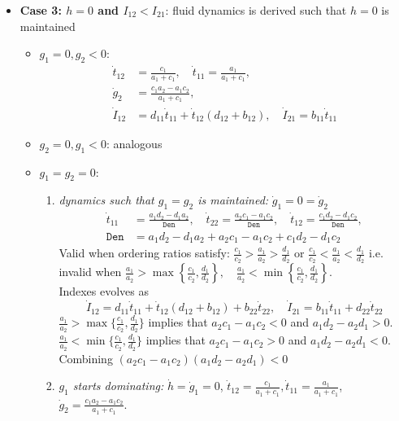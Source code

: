 \documentclass{article}
\begin{document}
\begin{itemize}[leftmargin=*, nosep]
  \item \textbf{Case 3: $h = 0$ and  $I_{12} < I_{21}$}: fluid dynamics is derived such that $h=0$ is maintained
  \begin{itemize}[leftmargin=*]
    \item $g_1 = 0, g_2 < 0$:
      \[
        \begin{aligned}
        \dot{t}_{12} &= \frac{c_1}{a_1 + c_1}, \quad \dot{t}_{11} = \frac{a_1}{a_1 + c_1}, \\
        \dot{g}_2 &= \frac{c_1 a_2 - a_1 c_2}{a_1 + c_1}, \\
        \dot{I}_{12} &= d_{11} \dot{t}_{11} + \dot{t}_{12}(d_{12} + b_{12}), \quad \dot{I}_{21} = b_{11} \dot{t}_{11}
        \end{aligned}
      \]
    \item $g_2 = 0, g_1 < 0$: analogous
    \item $g_1 = g_2 = 0$:
      \begin{enumerate}[label=(\roman*),leftmargin=*]
        \item \textit{dynamics such that $g_1=g_2$ is maintained:}  $\dot{g}_1=0=\dot{g}_2$
          \[
            \begin{aligned}
            \dot{t}_{11} &= \frac{a_1 d_2 - d_1 a_2}{\texttt{Den}}, \quad
            \dot{t}_{22} = \frac{a_2 c_1 - a_1 c_2}{\texttt{Den}}, \quad
            \dot{t}_{12} = \frac{c_1 d_2 - d_1 c_2}{\texttt{Den}}, \\
            \texttt{Den} &= a_1 d_2 - d_1 a_2 + a_2 c_1 - a_1 c_2 + c_1 d_2 - d_1 c_2
            \end{aligned}
          \]
          Valid when ordering ratios satisfy: $\frac{c_1}{c_2} > \frac{a_1}{a_2} > \frac{d_1}{d_2} \text{ or } \frac{c_1}{c_2} < \frac{a_1}{a_2} < \frac{d_1}{d_2}$ i.e. invalid when $\frac{a_1}{a_2}>\max\left\{\frac{c_1}{c_2},\frac{d_1}{d_2}\right\},\quad \frac{a_1}{a_2}<\min\left\{\frac{c_1}{c_2},\frac{d_1}{d_2}\right\}$. \\
          Indexes evolves as
\[\dot{I}_{12}=d_{11}\dot{t}_{11}+\dot{t}_{12}(d_{12}+b_{12})+b_{22}\dot{t}_{22},\quad \dot{I}_{21}=b_{11}\dot{t}_{11}+d_{22}\dot{t}_{22}\]
 $\frac{a_1}{a_2}>\max\{\frac{c_1}{c_2},\frac{d_1}{d_2}\}$ implies that $a_2c_1-a_1c_2<0$ and $a_1d_2-a_2d_1>0$.\\
  $\frac{a_1}{a_2}<\min\{\frac{c_1}{c_2},\frac{d_1}{d_2}\}$ implies that $a_2c_1-a_1c_2>0$ and $a_1d_2-a_2d_1<0$.\\
  Combining $(a_2c_1-a_1c_2)(a_1d_2-a_2d_1)<0$
    \item  \textit{$g_1$ starts dominating:} $\dot{h}=\dot{g}_1=0$, $\dot{t}_{12}=\frac{c_1}{a_1+c_1},\dot{t}_{11}=\frac{a_1}{a_1+c_1}$, $\dot{g}_2= \frac{c_1a_2-a_1c_2}{a_1+c_1}$.\\

\end{enumerate}
\end{itemize}
\end{itemize}
\end{document}
